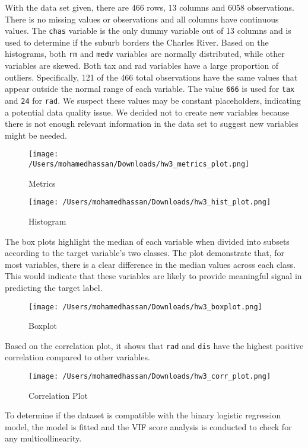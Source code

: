 \documentclass[
]{article}
\begin{document}
With the data set given, there are 466 rows, 13 columns and 6058
observations. There is no missing values or observations and all columns
have continuous values. The \texttt{chas} variable is the only dummy
variable out of 13 columns and is used to determine if the suburb
borders the Charles River. Based on the histograms, both \texttt{rm} and
\texttt{medv} variables are normally distributed, while other variables
are skewed. Both tax and rad variables have a large proportion of
outliers. Specifically, 121 of the 466 total observations have the same
values that appear outside the normal range of each variable. The value
\texttt{666} is used for \texttt{tax} and \texttt{24} for \texttt{rad}.
We suspect these values may be constant placeholders, indicating a
potential data quality issue. We decided not to create new variables
because there is not enough relevant information in the data set to
suggest new variables might be needed.

\begin{figure}
\centering
\texttt{[image: /Users/mohamedhassan/Downloads/hw3\_metrics\_plot.png]}
\caption{Metrics}
\end{figure}

\begin{figure}
\centering
\texttt{[image: /Users/mohamedhassan/Downloads/hw3\_hist\_plot.png]}
\caption{Histogram}
\end{figure}

The box plots highlight the median of each variable when divided into
subsets according to the target variable's two classes. The plot
demonstrate that, for most variables, there is a clear difference in the
median values across each class. This would indicate that these
variables are likely to provide meaningful signal in predicting the
target label.

\begin{figure}
\centering
\texttt{[image: /Users/mohamedhassan/Downloads/hw3\_boxplot.png]}
\caption{Boxplot}
\end{figure}

Based on the correlation plot, it shows that \texttt{rad} and
\texttt{dis} have the highest positive correlation compared to other
variables.

\begin{figure}
\centering
\texttt{[image: /Users/mohamedhassan/Downloads/hw3\_corr\_plot.png]}
\caption{Correlation Plot}
\end{figure}

To determine if the dataset is compatible with the binary logistic
regression model, the model is fitted and the VIF score analysis is
conducted to check for any multicollinearity.
\end{document}
